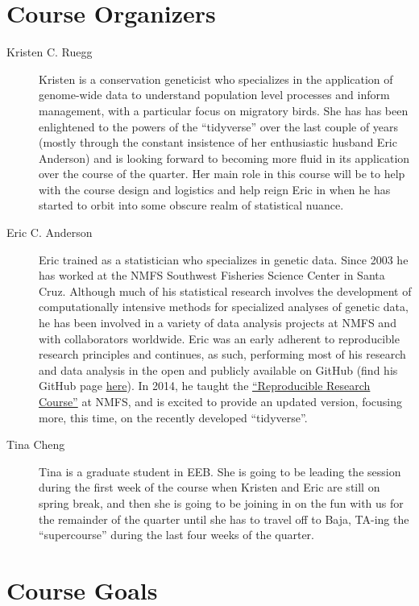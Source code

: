 \documentclass[]{book}
\theoremstyle{definition}
\theoremstyle{definition}
\theoremstyle{remark}
\begin{document}
\section{Course Organizers}\label{course-organizers}

\begin{description}
\item[Kristen C. Ruegg]
Kristen is a conservation geneticist who specializes in the application
of genome-wide data to understand population level processes and inform
management, with a particular focus on migratory birds. She has has been
enlightened to the powers of the ``tidyverse'' over the last couple of
years (mostly through the constant insistence of her enthusiastic
husband Eric Anderson) and is looking forward to becoming more fluid in
its application over the course of the quarter. Her main role in this
course will be to help with the course design and logistics and help
reign Eric in when he has started to orbit into some obscure realm of
statistical nuance.
\item[Eric C. Anderson]
Eric trained as a statistician who specializes in genetic data. Since
2003 he has worked at the NMFS Southwest Fisheries Science Center in
Santa Cruz. Although much of his statistical research involves the
development of computationally intensive methods for specialized
analyses of genetic data, he has been involved in a variety of data
analysis projects at NMFS and with collaborators worldwide. Eric was an
early adherent to reproducible research principles and continues, as
such, performing most of his research and data analysis in the open and
publicly available on GitHub (find his GitHub page
\href{https://github.com/eriqande}{here}). In 2014, he taught the
\href{http://eriqande.github.io/rep-res-web/}{``Reproducible Research
Course''} at NMFS, and is excited to provide an updated version,
focusing more, this time, on the recently developed ``tidyverse''.
\item[Tina Cheng]
Tina is a graduate student in EEB. She is going to be leading the
session during the first week of the course when Kristen and Eric are
still on spring break, and then she is going to be joining in on the fun
with us for the remainder of the quarter until she has to travel off to
Baja, TA-ing the ``supercourse'' during the last four weeks of the
quarter.
\end{description}

\section{Course Goals}\label{course-goals}
\end{document}

